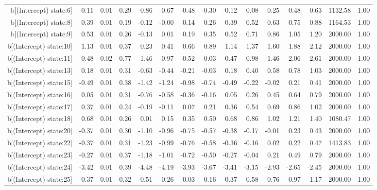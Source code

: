 \begin{table}[ht]
\begin{tabular}{rrrrrrrrrrrrrrr}
  b[(Intercept) state:6] & -0.11 & 0.01 & 0.29 & -0.86 & -0.67 & -0.48 & -0.30 & -0.12 & 0.08 & 0.25 & 0.48 & 0.63 & 1132.58 & 1.00 \\ 
  b[(Intercept) state:8] & 0.39 & 0.01 & 0.19 & -0.12 & -0.00 & 0.14 & 0.26 & 0.39 & 0.52 & 0.63 & 0.75 & 0.88 & 1164.53 & 1.00 \\ 
  b[(Intercept) state:9] & 0.53 & 0.01 & 0.26 & -0.13 & 0.01 & 0.19 & 0.35 & 0.52 & 0.71 & 0.86 & 1.05 & 1.20 & 2000.00 & 1.00 \\ 
  b[(Intercept) state:10] & 1.13 & 0.01 & 0.37 & 0.23 & 0.41 & 0.66 & 0.89 & 1.14 & 1.37 & 1.60 & 1.88 & 2.12 & 2000.00 & 1.00 \\ 
  b[(Intercept) state:11] & 0.48 & 0.02 & 0.77 & -1.46 & -0.97 & -0.52 & -0.03 & 0.47 & 0.98 & 1.46 & 2.06 & 2.61 & 2000.00 & 1.00 \\ 
  b[(Intercept) state:13] & 0.18 & 0.01 & 0.31 & -0.63 & -0.44 & -0.21 & -0.03 & 0.18 & 0.40 & 0.58 & 0.78 & 1.03 & 2000.00 & 1.00 \\ 
  b[(Intercept) state:15] & -0.49 & 0.01 & 0.38 & -1.42 & -1.24 & -0.98 & -0.74 & -0.49 & -0.22 & -0.02 & 0.21 & 0.41 & 2000.00 & 1.00 \\ 
  b[(Intercept) state:16] & 0.05 & 0.01 & 0.31 & -0.76 & -0.58 & -0.36 & -0.16 & 0.05 & 0.26 & 0.45 & 0.64 & 0.79 & 2000.00 & 1.00 \\ 
  b[(Intercept) state:17] & 0.37 & 0.01 & 0.24 & -0.19 & -0.11 & 0.07 & 0.21 & 0.36 & 0.54 & 0.69 & 0.86 & 1.02 & 2000.00 & 1.00 \\ 
  b[(Intercept) state:18] & 0.68 & 0.01 & 0.26 & 0.01 & 0.15 & 0.35 & 0.50 & 0.68 & 0.86 & 1.02 & 1.21 & 1.40 & 1080.47 & 1.00 \\ 
  b[(Intercept) state:20] & -0.37 & 0.01 & 0.30 & -1.10 & -0.96 & -0.75 & -0.57 & -0.38 & -0.17 & -0.01 & 0.23 & 0.43 & 2000.00 & 1.00 \\ 
  b[(Intercept) state:22] & -0.37 & 0.01 & 0.31 & -1.23 & -0.99 & -0.76 & -0.58 & -0.36 & -0.16 & 0.02 & 0.22 & 0.47 & 1413.83 & 1.00 \\ 
  b[(Intercept) state:23] & -0.27 & 0.01 & 0.37 & -1.18 & -1.01 & -0.72 & -0.50 & -0.27 & -0.04 & 0.21 & 0.49 & 0.79 & 2000.00 & 1.00 \\ 
  b[(Intercept) state:24] & -3.42 & 0.01 & 0.39 & -4.48 & -4.19 & -3.93 & -3.67 & -3.41 & -3.15 & -2.93 & -2.65 & -2.45 & 2000.00 & 1.00 \\ 
  b[(Intercept) state:25] & 0.37 & 0.01 & 0.32 & -0.51 & -0.26 & -0.03 & 0.16 & 0.37 & 0.58 & 0.76 & 0.97 & 1.17 & 2000.00 & 1.00 \\ 

\end{tabular}
\end{table}
